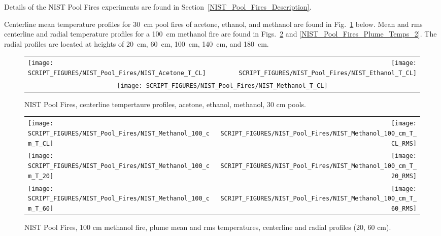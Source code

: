 Details of the NIST Pool Fires experiments are found in Section~\ref{NIST_Pool_Fires_Description}.

Centerline mean temperature profiles for 30~cm pool fires of acetone, ethanol, and methanol are found in Fig.~\ref{NIST_Pool_Fires_Temperature} below. Mean and rms centerline and radial temperature profiles for a 100~cm methanol fire are found in Figs.~\ref{NIST_Pool_Fires_Plume_Temps_1} and \ref{NIST_Pool_Fires_Plume_Temps_2}. The radial profiles are located at heights of 20~cm, 60~cm, 100~cm, 140~cm, and 180~cm.

\begin{figure}[!ht]
\begin{tabular*}{\textwidth}{l@{\extracolsep{\fill}}r}
\texttt{[image: SCRIPT\_FIGURES/NIST\_Pool\_Fires/NIST\_Acetone\_T\_CL]} &
\texttt{[image: SCRIPT\_FIGURES/NIST\_Pool\_Fires/NIST\_Ethanol\_T\_CL]} \\
\multicolumn{2}{c}{\texttt{[image: SCRIPT\_FIGURES/NIST\_Pool\_Fires/NIST\_Methanol\_T\_CL]}}
\end{tabular*}
\caption[NIST Pool Fires, centerline temperature profiles, acetone, ethanol, methanol, 30 cm pools]
{NIST Pool Fires, centerline tempertaure profiles, acetone, ethanol, methanol, 30 cm pools.}
\label{NIST_Pool_Fires_Temperature}
\end{figure}


\begin{figure}[!ht]
\begin{tabular*}{\textwidth}{l@{\extracolsep{\fill}}r}
\texttt{[image: SCRIPT\_FIGURES/NIST\_Pool\_Fires/NIST\_Methanol\_100\_cm\_T\_CL]} &
\texttt{[image: SCRIPT\_FIGURES/NIST\_Pool\_Fires/NIST\_Methanol\_100\_cm\_T\_CL\_RMS]} \\
\texttt{[image: SCRIPT\_FIGURES/NIST\_Pool\_Fires/NIST\_Methanol\_100\_cm\_T\_20]} &
\texttt{[image: SCRIPT\_FIGURES/NIST\_Pool\_Fires/NIST\_Methanol\_100\_cm\_T\_20\_RMS]} \\
\texttt{[image: SCRIPT\_FIGURES/NIST\_Pool\_Fires/NIST\_Methanol\_100\_cm\_T\_60]} &
\texttt{[image: SCRIPT\_FIGURES/NIST\_Pool\_Fires/NIST\_Methanol\_100\_cm\_T\_60\_RMS]}
\end{tabular*}
\caption[NIST Pool Fires, 100 cm methanol, plume mean and rms temperatures]
{NIST Pool Fires, 100 cm methanol fire, plume mean and rms temperatures, centerline and radial profiles (20, 60 cm).}
\label{NIST_Pool_Fires_Plume_Temps_1}
\end{figure}

